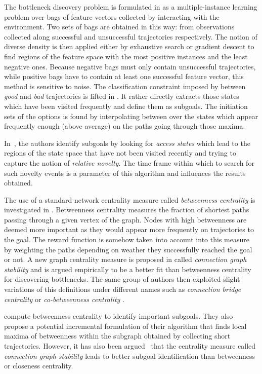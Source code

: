 The bottleneck discovery problem is formulated in \cite{Mcgovern2001} as a multiple-instance learning problem over bags of feature vectors collected by interacting with the environment. Two sets of bags are obtained in this way: from observations collected along successful and unsuccessful trajectories respectively. The notion of diverse density is then applied  either by exhaustive search or gradient descent to find regions of the feature space with the most positive instances and the least negative ones. Because negative bags must only contain unsuccessful trajectories, while positive bags have to contain at least one successful feature vector, this method is sensitive to noise. The classification constraint imposed  by \cite{Mcgovern2001} between \textit{good} and \textit{bad} trajectories is lifted in \cite{Stolle2002}. It rather directly extracts those states which have been visited frequently and define them as subgoals. The initiation sets of the options is found by interpolating between over the states which appear frequently enough (above average) on the paths going through those maxima.

In~\cite{Simsek2004}, the authors identify subgoals by looking for \textit{access states} which lead to the regions of the state space that have not been visited recently and trying to capture the notion of \textit{relative novelty}. The time frame within which to search for such novelty events is a parameter of this algorithm and influences the results obtained.

The use of a standard network centrality measure called \textit{betweenness centrality} is investigated in \cite{Simsek2008}. Betweenness centrality measures the fraction of shortest paths passing through a given vertex of the graph. Nodes with high betweenness are deemed more important as they would appear more frequently on trajectories to the goal. The reward function is somehow taken into account into this measure by weighting the paths depending on weather they successfully reached the goal or not. A new graph centrality measure is proposed in \cite{Rad2010} called \textit{connection graph stability} and is argued empirically to be a better fit than betweenness centrality for discovering bottlenecks. The same group of authors then exploited slight variations of this definitions under different names such as \textit{connection bridge centrality} or \textit{co-betweenness centrality} \cite{Moradi2010}.  

compute betweenness centrality to identify important subgoals. They
also propose a potential incremental formulation of their algorithm
that finds local maxima of betweenness within the subgraph obtained
by collecting short trajectories. However, it has also been argued~\cite{Rad2010} that
the centrality measure called \textit{connection graph stability} leads
to better subgoal identification than betweenness or closeness centrality.

